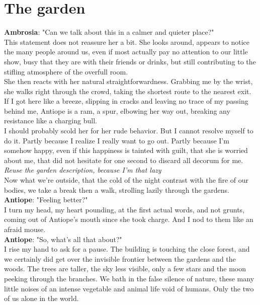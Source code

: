 \documentclass{report}
\newcommand{\dcomment}[1]{
	\emph{#1}
	\\
}
\newcommand{\speaker}[1]{
	\textbf{#1}: 
}
\newcommand{\gsection}[1]{
	\section*{#1}
	\label{#1}
}
\begin{document}
\gsection{The garden}

\speaker{Ambrosia} "Can we talk about this in a calmer and quieter place?"\\

This statement does not reassure her a bit. She looks around, appears to notice the many people around us, even if most actually pay no attention to our little show, busy that they are with their friends or drinks, but still contributing to the stifling atmosphere of the overfull room.\\

She then reacts with her natural straightforwardness. Grabbing me by the wrist, she walks right through the crowd, taking the shortest route to the nearest exit. If I got here like a breeze, slipping in cracks and leaving no trace of my passing behind me, Antiope is a ram, a spur, elbowing her way out, breaking any resistance like a charging bull.\\

I should probably scold her for her rude behavior. But I cannot resolve myself to do it. Partly because I realize I really want to go out. Partly because I'm somehow happy, even if this happiness is tainted with guilt, that she is worried about me, that did not hesitate for one second to discard all decorum for me.\\

\dcomment{
	Reuse the garden description, because I'm that lazy
}

Now what we're outside, that the cold of the night contrast with the fire of our bodies, we take a break then a walk, strolling lazily through the gardens.\\

\speaker{Antiope} "Feeling better?"\\

I turn my head, my heart pounding, at the first actual words, and not grunts, coming out of Antiope's mouth since she took charge. And I nod to them like an afraid mouse.\\

\speaker{Antiope} "So, what's all that about?"\\

I rise my hand to ask for a pause. The  building is touching the close forest, and we certainly did get over the invisible frontier between the gardens and the woods. The trees are taller, the sky less visible, only a few stars and the moon peeking through the branches. We bath in the false silence of nature, these many little noises of an intense vegetable and animal life void of humans. Only the two of us alone in the world.\\
\end{document}
